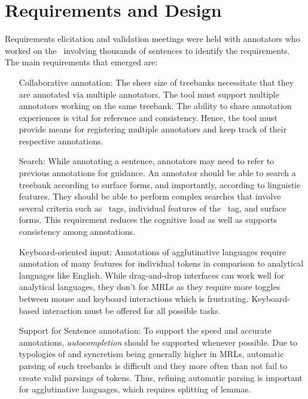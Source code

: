 \section{Requirements and Design}
\label{sec:requirements}


Requirements elicitation and validation meetings were held with annotators who worked on the  \bountreebank\ involving thousands of sentences to identify the requirements.
The main requirements that emerged are:
\begin{itemize}[before=\normalfont, font=\itshape, align=left,noitemsep,topsep=0pt,parsep=0pt,partopsep=0pt,labelsep=3pt,align=left]
    \item[Collaborative annotation:]
        The sheer size of treebanks necessitate that they are annotated via multiple annotators.
        The tool must support multiple annotators working on the same treebank.
        The ability to share annotation experiences is vital for reference and consistency.
        Hence, the tool must provide means for registering multiple annotators and keep track of their respective annotations.
    \item[Search:]
        While annotating a sentence, annotators may need to refer to previous annotations for guidance.
        An annotator should be able to search a treebank according to surface forms, and importantly, according to linguistic features.
        They should be able to perform complex searches that involve several criteria such as \ud\ tags, individual features of the \feats\ tag, and surface forms.
        This requirement reduces the cognitive load as well as supports consistency among annotations.
    \item[Keyboard-oriented input:]
        Annotations of agglutinative languages require annotation of many features for individual tokens in comparison to analytical languages like English.
        While drag-and-drop interfaces can work well for analytical languages, they don't for MRLs as they require more toggles between mouse and keyboard interactions which is frustrating.
        Keyboard-based interaction must be offered for all possible tasks.
    \item[Support for Sentence annotation:]
        To support the speed and accurate annotations, \textit{autocompletion} should be supported whenever possible.
        Due to typologies of and syncretism being generally higher in MRLs, automatic parsing of such treebanks is difficult and they more often than not fail to create valid parsings of tokens.
        Thus, refining automatic parsing is important for agglutinative languages, which requires splitting of lemmas.

\end{itemize}
